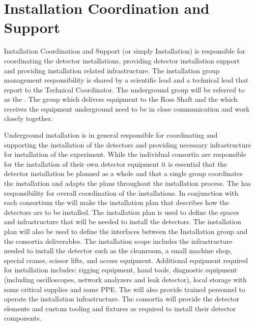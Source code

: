 \section{Installation Coordination and Support}
\label{sec:fdsp-coord-install}


Installation Coordination and Support (or simply Installation) is
responsible for coordinating the detector installations, providing
detector installation support and providing installation related
infrastructure. The installation group management responsibility is
shared by a scientific lead and a technical lead that report to the
Technical Coordinator. The underground group will be referred to as
the . The  group which delivers equipment to the
Ross Shaft and the  which receives the equipment
underground need to be in close communication and work closely
together.

Underground installation is in general responsible for coordinating
and supporting the installation of the detectors and providing
necessary infrastructure for installation of the experiment. While the individual
consortia are responsible for the installation of their own detector
equipment it is essential that the detector installation be planned
as a whole and that a single group coordinates the installation and
adapts the plans throughout the installation process. The  has 
responsibility for overall coordination of the installations. In
conjunction with each consortium the  will make the installation
plan that describes how the detectors are to be installed. The
installation plan is used to define the spaces and infrastructure that
will be needed to install the detectors. The installation plan will
also be used to define the interfaces between the Installation group
and the consortia deliverables.  The installation scope includes the
infrastructure needed to install the detector such as the cleanroom, a
small machine shop, special cranes, scissor lifts, and access equipment.
Additional equipment required for installation includes: rigging equipment, hand tools, diagnostic equipment
(including oscilloscopes, network analyzers and leak detector), local storage with some critical supplies and some PPE. The  will also provide trained personnel to operate the installation
infrastructure. The consortia will provide the detector elements and
custom tooling and fixtures as required to install their detector
components.

